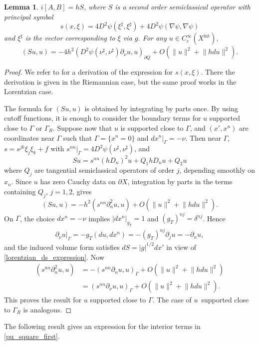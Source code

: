\documentclass[11pt,letterpaper]{amsart}
\newtheorem{Lemma}[Theorem]{Lemma}
\theoremstyle{definition}
\numberwithin{equation}{section}
\newcommand{\norm}[1]{\lVert #1 \rVert}         %
\newcommand{\p}{\partial}
\def\p{\partial}
\begin{document}
\begin{Lemma} \label{lemma_pu_commutator}
$i[A, B] = h S$, where $S$ is a second order semiclassical operator with principal symbol 
\[
s(x, \xi) = 4 D^2 \psi(\xi^{\sharp}, \xi^{\sharp}) + 4 D^2 \psi( \nabla \psi, \nabla \psi )
\]
and $\xi^{\sharp}$ is the vector corresponding to $\xi$ via $g$. For any $u \in C^{\infty}_c(X^{\mathrm{int}})$, 
\[
(Su, u) = -4 h^2 (D^2 \psi(\nu^{\sharp}, \nu^{\sharp}) \p_{\nu} u, u)_{\p Q} + O(\norm{u}^2 + \norm{hdu}^2).
\]
\end{Lemma}
\begin{proof}
We refer to \cite{dos-santos-ferreira2009} for a derivation 
of the expression for $s(x,\xi)$. There the derivation is given in the Riemannian case, but the same proof works in the Lorentzian case.

The formula for $(Su, u)$ is obtained by integrating by parts once. By using cutoff functions, it is enough to consider the boundary terms for $u$ supported close to $\Gamma$ or $\Gamma_R$.
Suppose now that $u$ is supported close to $\Gamma$, and $(x',x^n)$ are coordinates near $\Gamma$ such that $\Gamma = \{ x^n = 0 \}$ and $dx^n|_{\Gamma} = -\nu$. Then near $\Gamma$, $s = s^{jk} \xi_j \xi_k + f$ with $s^{nn}|_{\Gamma} = 4 D^2 \psi(\nu^{\sharp}, \nu^{\sharp})$, and  
\[
Su = s^{nn} (hD_n)^2 u + Q_1 hD_n u + Q_2 u
\]
where $Q_j$ are tangential semiclassical operators of order $j$, depending smoothly on $x_n$. Since  $u$ has zero Cauchy data on $\p X$, integration by parts in the terms containing $Q_j$, $j=1,2$, gives
\[
(Su, u) = -h^2 (s^{nn} \p_n^2 u, u) + O(\norm{u}^2 + \norm{hdu}^2).
\]
On $\Gamma$, the choice $dx^n = -\nu$ implies $|dx^n|_{g_T} = 1$ and $(g_T)^{nj} = \delta^{nj}$. Hence
    \begin{align*}
\p_{\nu} u|_{\Gamma} = -g_T(du, dx^n) = -(g_T)^{nj} \p_j u = -\p_n u,
    \end{align*}
and the induced volume form satisfies $dS = |g|^{1/2} dx'$ in view of \eqref{lorentzian_ds_expression}. Now
\begin{align*}
(s^{nn} \p_n^2 u, u) &= -(s^{nn} \p_n u, u)_{\Gamma} + O(\norm{u}^2 + \norm{hdu}^2) \\
 &= (s^{nn} \p_{\nu} u, u)_{\Gamma} + O(\norm{u}^2 + \norm{hdu}^2).
\end{align*}
This proves the result for $u$ supported close to $\Gamma$. The case of $u$ supported close to $\Gamma_R$ is analogous.
\end{proof}

The following result gives an expression for the interior terms in \eqref{pu_square_first}.
\end{document}
